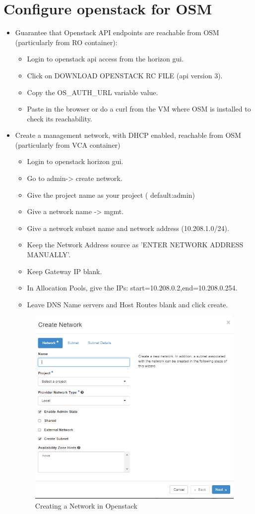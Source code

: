 \section{Configure openstack for OSM}
\begin{itemize}

\item Guarantee that Openstack API endpoints are reachable from OSM (particularly from RO container):
\begin{itemize}
\item Login to openstack api access from the horizon gui.
\item Click on DOWNLOAD OPENSTACK RC FILE (api version 3).
\item Copy the OS_AUTH_URL variable value.
\item Paste in the browser or do a curl from the VM where OSM is installed to check its reachability. 
\end{itemize}

\item Create a management network, with DHCP enabled, reachable from OSM (particularly from VCA container)
\begin{itemize}
\item Login to openstack horizon gui.
\item Go to admin-> create network.
\item Give the project name as your project ( default:admin)
\item Give a network name -> mgmt.
\item Give a network subnet name and network address (10.208.1.0/24). 
\item Keep the Network Address source as 'ENTER NETWORK ADDRESS MANUALLY'.
\item Keep Gateway IP blank.
\item In Allocation Pools, give the IPs:  start=10.208.0.2,end=10.208.0.254.
\item Leave DNS Name servers and Host Routes blank and click create.
\end{itemize}
\begin{figure}[h]
	\centering
	\includegraphics[width=0.5\linewidth]{figures/sh11}
	\caption{Creating a Network in Openstack}
\end{figure} 


\end{itemize}
